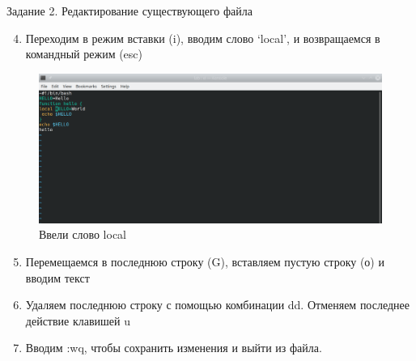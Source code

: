 \begin{frame}{Задание 2. Редактирование существующего файла}
\begin{enumerate}
\setcounter{enumi}{3}
\tightlist
\item
  Переходим в режим вставки (i), вводим слово `local', и возвращаемся в
  командный режим (esc)
\end{enumerate}

\begin{figure}
\hypertarget{fig:007}{%
\centering
\includegraphics[width=1\textwidth,height=\textheight]{image/7.png}
\caption{Ввели слово local}\label{fig:007}
}
\end{figure}

\begin{enumerate}
\setcounter{enumi}{4}
\item
  Перемещаемся в последнюю строку (G), вставляем пустую строку (о) и
  вводим текст
\item
  Удаляем последнюю строку с помощью комбинации dd. Отменяем последнее
  действие клавишей u
\item
  Вводим :wq, чтобы сохранить изменения и выйти из файла.
\end{enumerate}
\end{frame}
